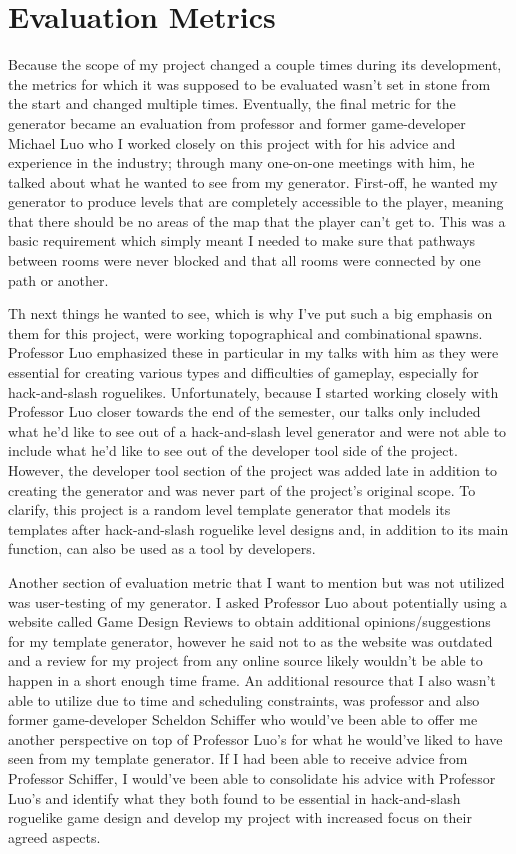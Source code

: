 \documentclass[10pt,twocolumn]{article}
\begin{document}
\section{Evaluation Metrics}

Because the scope of my project changed a couple times during its development, the metrics for which it was supposed to be evaluated wasn't set in stone from the start and changed multiple times. Eventually, the final metric for the generator became an evaluation from professor and former game-developer Michael Luo who I worked closely on this project with for his advice and experience in the industry; through many one-on-one meetings with him, he talked about what he wanted to see from my generator. First-off, he wanted my generator to produce levels that are completely accessible to the player, meaning that there should be no areas of the map that the player can't get to. This was a basic requirement which simply meant I needed to make sure that pathways between rooms were never blocked and that all rooms were connected by one path or another. 

Th next things he wanted to see, which is why I've put such a big emphasis on them for this project, were working topographical and combinational spawns. Professor Luo emphasized these in particular in my talks with him as they were essential for creating various types and difficulties of gameplay, especially for hack-and-slash roguelikes. Unfortunately, because I started working closely with Professor Luo closer towards the end of the semester, our talks only included what he'd like to see out of a hack-and-slash level generator and were not able to include what he'd like to see out of the developer tool side of the project. However, the developer tool section of the project was added late in addition to creating the generator and was never part of the project's original scope. To clarify, this project is a random level template generator that models its templates after hack-and-slash roguelike level designs and, in addition to its main function, can also be used as a tool by developers.

Another section of evaluation metric that I want to mention but was not utilized was user-testing of my generator. I asked Professor Luo about potentially using a website called Game Design Reviews\cite{majewski2010game} to obtain additional opinions/suggestions for my template generator, however he said not to as the website was outdated and a review for my project from any online source likely wouldn't be able to happen in a short enough time frame. An additional resource that I also wasn't able to utilize due to time and scheduling constraints, was professor and also former game-developer Scheldon Schiffer who would've been able to offer me another perspective on top of Professor Luo's for what he would've liked to have seen from my template generator. If I had been able to receive advice from Professor Schiffer, I would've been able to consolidate his advice with Professor Luo's and identify what they both found to be essential in hack-and-slash roguelike game design and develop my project with increased focus on their agreed aspects. 
\end{document}
